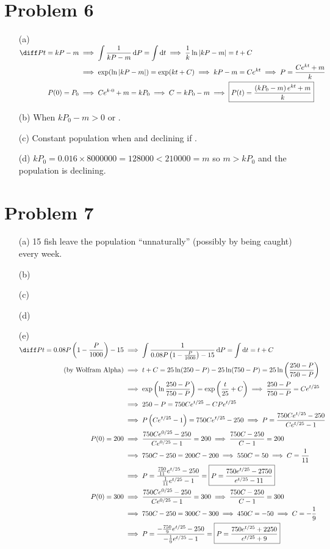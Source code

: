 \documentclass[preview, margin=0.6in]{standalone}
\newcommand*{\problem}[1]{\section*{Problem #1}}
\begin{document}
\problem{6}
\begin{itemize}
	\item[(a)]
		$\begin{aligned}[t]
		    \diff Pt=kP-m
			&\implies \int \frac{1}{kP-m}\,\mathrm{d}P=\int \mathrm{d}t
			\implies \frac1k \ln|kP-m|=t+C \\
			&\implies \exp(\ln|kP-m|)=\exp(kt+C)
			\implies kP-m=Ce^{kt}
			\implies P=\frac{Ce^{kt}+m}{k} \\
			P(0)=P_0
			&\implies Ce^{k\cdot0}+m=kP_0
			\implies C=kP_0-m
			\implies\boxed{P(t)=\frac{\left(kP_0-m\right)e^{kt}+m}{k}}
		\end{aligned}$

	\item[(b)] When $kP_0-m>0$ or .
	\item[(c)] Constant population when  and declining if .
	\item[(d)] $kP_0=0.016\times8000000=128000<210000=m$ so $m>kP_0$ and the population is declining.
\end{itemize}

\problem{7}
\begin{itemize}
	\item[(a)] 15 fish leave the population ``unnaturally'' (possibly by being caught) every week.
	\item[(b)]
	\item[(c)]
	\item[(d)]
	\item[(e)]
		$\begin{aligned}[t]
		    \diff Pt=0.08P \left(1-\frac{P}{1000}\right)-15
			&\implies \int \frac{1}{0.08P \left(1-\frac{P}{1000}\right)-15}\,\mathrm{d}P=\int \mathrm{d}t=t+C \\
			\text{(by Wolfram Alpha)}&\implies t+C=25\ln(250-P)-25\ln(750-P)
			=25\ln \left(\frac{250-P}{750-P}\right) \\
			&\implies \exp \left(\ln \frac{250-P}{750-P}\right)=\exp \left(\frac{t}{25}+C\right)
			\implies \frac{250-P}{750-P}=Ce^{t/25} \\
			&\implies 250-P=750Ce^{t/25}-CPe^{t/25} \\
			&\implies P\left(Ce^{t/25}-1\right)=750Ce^{t/25}-250
			\implies P=\frac{750Ce^{t/25}-250}{Ce^{t/25}-1} \\
			P(0)=200
			&\implies \frac{750Ce^{0/25}-250}{Ce^{0/25}-1}=200
			\implies \frac{750C-250}{C-1}=200 \\
			&\implies 750C-250=200C-200
			\implies 550C=50
			\implies C=\frac{1}{11} \\
			&\implies P=\frac{\frac{750}{11}e^{t/25}-250}{\frac{1}{11}e^{t/25}-1}
			=\boxed{P=\frac{750e^{t/25}-2750}{e^{t/25}-11}} \\
			P(0)=300
			&\implies \frac{750Ce^{0/25}-250}{Ce^{0/25}-1}=300
			\implies \frac{750C-250}{C-1}=300 \\
			&\implies 750C-250=300C-300
			\implies 450C=-50
			\implies C=-\frac19 \\
			&\implies P=\frac{-\frac{750}{9}e^{t/25}-250}{-\frac{1}{9}e^{t/25}-1}
			=\boxed{P=\frac{750e^{t/25}+2250}{e^{t/25}+9}}
		\end{aligned}$
\end{itemize} 
\end{document}
